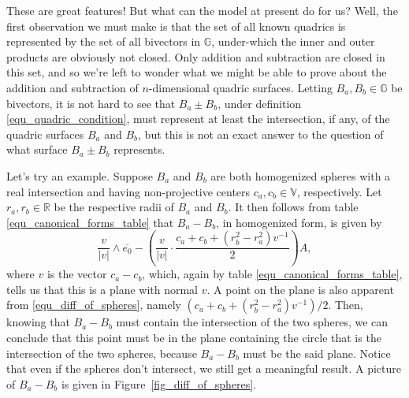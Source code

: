 \documentclass{birkjour}
\theoremstyle{definition}
\theoremstyle{remark}
\numberwithin{equation}{section}
\newcommand{\G}{\mathbb{G}}
\newcommand{\V}{\mathbb{V}}
\newcommand{\R}{\mathbb{R}}
\begin{document}
These are great features!  But what can the model at present do for us?  Well,
the first observation we must make is that the set of all known quadrics
is represented by the set of all bivectors in $\G$, under-which the inner
and outer products are obviously not closed.  Only addition and subtraction
are closed in this set, and so we're left to wonder what we might be able
to prove about the addition and subtraction of $n$-dimensional quadric surfaces.
Letting $B_a,B_b\in\G$ be bivectors, it is not hard to see that $B_a\pm B_b$, under
definition \eqref{equ_quadric_condition}, must represent at least the intersection, if any,
of the quadric surfaces $B_a$ and $B_b$, but this is not an exact answer to the
question of what surface $B_a\pm B_b$ represents.

Let's try an example.  Suppose $B_a$ and $B_b$ are both homogenized spheres with
a real intersection and having
non-projective centers $c_a,c_b\in\V$, respectively.  Let $r_a,r_b\in\R$
be the respective radii of $B_a$ and $B_b$.  It then follows from
table \eqref{equ_canonical_forms_table} that $B_a-B_b$, in homogenized
form, is given by
\begin{equation}\label{equ_diff_of_spheres}
\frac{v}{|v|}\wedge\overline{e_0}-\left(\frac{v}{|v|}\cdot\frac{c_a+c_b+(r_b^2-r_a^2)v^{-1}}{2}\right)A,
\end{equation}
where $v$ is the vector $c_a-c_b$, which, again by table \eqref{equ_canonical_forms_table},
tells us that this is a plane with normal $v$.  A point on the plane is also apparent from
\eqref{equ_diff_of_spheres}, namely $(c_a+c_b+(r_b^2-r_a^2)v^{-1})/2$.
Then, knowing that $B_a-B_b$ must contain the intersection of the
two spheres, we can conclude that this point must be in the plane containing the circle that is
the intersection of the two spheres, because $B_a-B_b$ must be the said plane.  Notice
that even if the spheres don't intersect, we still get a meaningful result.  A picture of
$B_a-B_b$ is given in Figure~\ref{fig_diff_of_spheres}.
\end{document}
